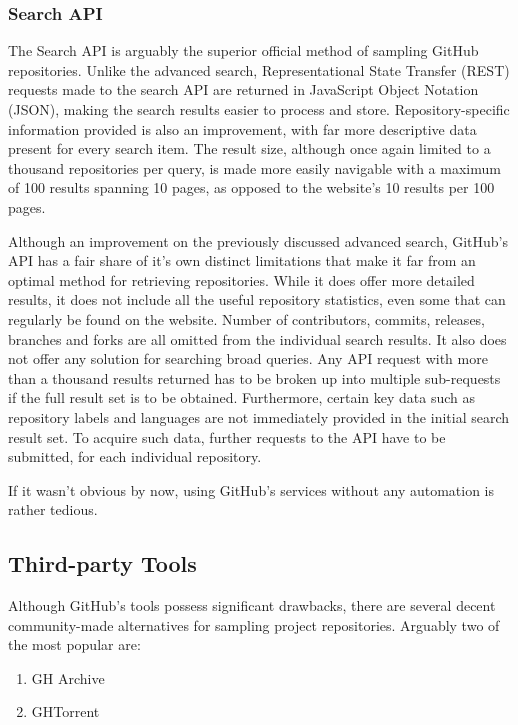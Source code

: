 \subsubsection{Search API}

The Search API is arguably the superior official method of sampling GitHub repositories.
Unlike the advanced search, Representational State Transfer (REST) requests made to the search API are returned in JavaScript Object Notation (JSON), making the search results easier to process and store.
Repository-specific information provided is also an improvement, with far more descriptive data present for every search item.
The result size, although once again limited to a thousand repositories per query, is made more easily navigable with a maximum of 100 results spanning 10 pages, as opposed to the website's 10 results per 100 pages.

Although an improvement on the previously discussed advanced search, GitHub's API has a fair share of it's own distinct limitations that make it far from an optimal method for retrieving repositories.
While it does offer more detailed results, it does not include all the useful repository statistics, even some that can regularly be found on the website.
Number of contributors, commits, releases, branches and forks are all omitted from the individual search results.
It also does not offer any solution for searching broad queries.
Any API request with more than a thousand results returned has to be broken up into multiple sub-requests if the full result set is to be obtained.
Furthermore, certain key data such as repository labels and languages are not immediately provided in the initial search result set.
To acquire such data, further requests to the API have to be submitted, for each individual repository.

If it wasn't obvious by now, using GitHub's services without any automation is rather tedious.

\newpage
\subsection{Third-party Tools}

Although GitHub's tools possess significant drawbacks, there are several decent community-made alternatives for sampling project repositories.
Arguably two of the most popular are:
\begin{enumerate}
    \item GH Archive
    \item GHTorrent
\end{enumerate}


